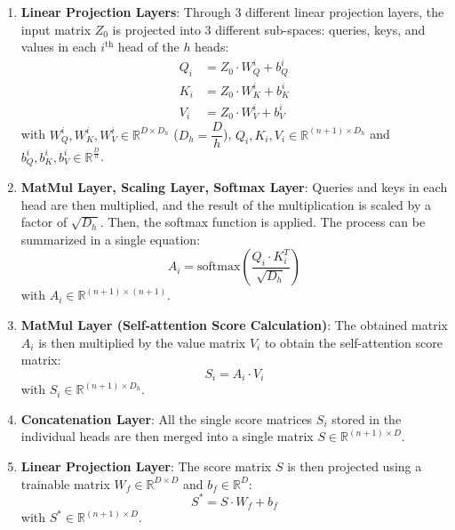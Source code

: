 \documentclass[12pt]{article}
\begin{document}
\begin{enumerate}
    \item \textbf{Linear Projection Layers}: Through 3 different linear projection layers, the input matrix $Z_0$
    is projected into 3 different sub-spaces: queries, keys, and values in each $i^{\text{th}}$ head of the $h$ heads:
    \begin{equation}
        \begin{aligned}
            Q_i &= Z_0 \cdot W_Q^i + b_Q^i \\
            K_i &= Z_0 \cdot W_K^i + b_K^i \\
            V_i &= Z_0 \cdot W_V^i + b_V^i
        \end{aligned}
    \end{equation} 
    with $W_Q^i, W_K^i, W_V^i \in \mathbb{R}^{D \times D_h}$ ($D_h = \dfrac{D}{h}$), 
    $Q_i, K_i, V_i \in \mathbb{R}^{(n+1) \times D_h}$ and $b_Q^i, b_K^i, b_V^i \in \mathbb{R}^{\frac{D}{h}}$.

    \item \textbf{MatMul Layer, Scaling Layer, Softmax Layer}: Queries and keys in each head are then multiplied, 
    and the result of the multiplication is scaled by a factor of $\sqrt{D_h}$. Then, the softmax function is applied. 
    The process can be summarized in a single equation: 
    \begin{equation}
        A_i = \text{softmax} \left( \dfrac{Q_i \cdot K_i^T}{\sqrt{D_h}} \right)
    \end{equation}
    with $A_i \in \mathbb{R}^{(n+1) \times (n+1)}$.

    \item \textbf{MatMul Layer (Self-attention Score Calculation)}: The obtained matrix $A_i$ is then multiplied 
    by the value matrix $V_i$ to obtain the self-attention score matrix:
    \begin{equation}
        S_i = A_i \cdot V_i
    \end{equation}
    with $S_i \in \mathbb{R}^{(n+1) \times D_h}$.

    \item \textbf{Concatenation Layer}: All the single score matrices $S_i$ stored in the individual heads are then merged 
    into a single matrix $S \in \mathbb{R}^{(n+1) \times D}$.

    \item \textbf{Linear Projection Layer}: The score matrix $S$ is then projected using a trainable matrix 
    $W_f \in \mathbb{R}^{D \times D}$ and $b_f \in \mathbb{R}^{D}$:
    \begin{equation}
        S^* = S \cdot W_f + b_f
    \end{equation}
    with $S^* \in \mathbb{R}^{(n+1) \times D}$.
\end{enumerate}
\end{document}

